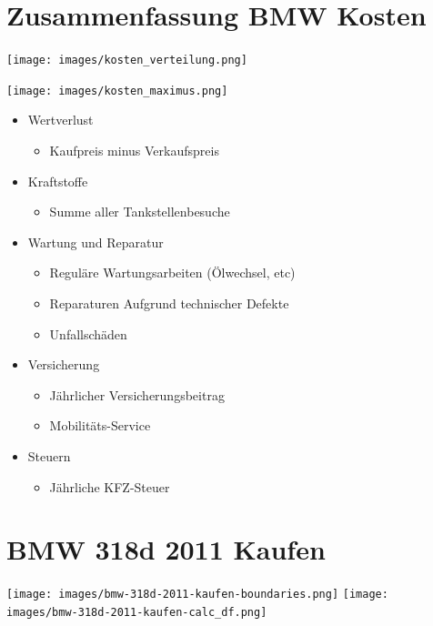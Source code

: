 \documentclass[landscape, DIV=99, 14pt]{scrartcl}
\begin{document}
\twocolumn
\section*{Zusammenfassung BMW Kosten}
\null
\vspace{1cm}
\begin{center}
\texttt{[image: images/kosten\_verteilung.png]}
\end{center}

\texttt{[image: images/kosten\_maximus.png]}

\pagebreak

\begin{itemize}
    \item Wertverlust
    \begin{itemize}
        \item Kaufpreis minus Verkaufspreis
    \end{itemize}
    \item Kraftstoffe
    \begin{itemize}
        \item Summe aller Tankstellenbesuche
    \end{itemize}
    \item Wartung und Reparatur
    \begin{itemize}
        \item Regul\"are Wartungsarbeiten (\"Olwechsel, etc)
        \item Reparaturen Aufgrund technischer Defekte
        \item Unfallsch\"aden
    \end{itemize}
    \item Versicherung
    \begin{itemize}
        \item J\"ahrlicher Versicherungsbeitrag
        \item Mobilit\"ats-Service
    \end{itemize}
    \item Steuern
    \begin{itemize}
            \item J\"ahrliche KFZ-Steuer
    \end{itemize}
\end{itemize}


\twocolumn

\section*{BMW 318d 2011 Kaufen}
\begin{center}
\texttt{[image: images/bmw-318d-2011-kaufen-boundaries.png]}
\null
\vspace{0.5cm}
\texttt{[image: images/bmw-318d-2011-kaufen-calc\_df.png]}
\end{center}
\end{document}

